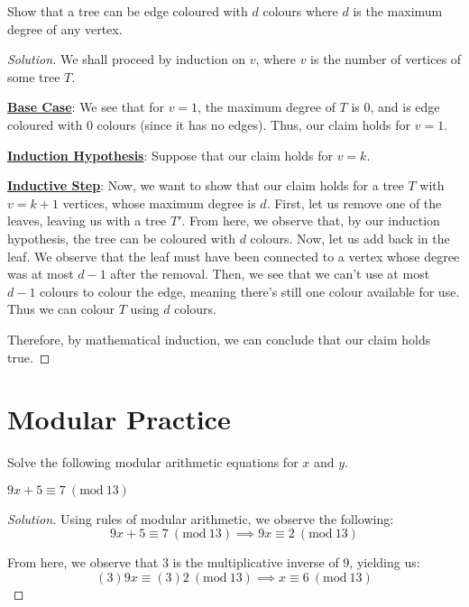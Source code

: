 \documentclass{article}
\newenvironment{solution}{\begin{proof}[Solution]}{\end{proof}}
\newcommand{\Mod}[1]{\ (\mathrm{mod}\ {#1})}
\begin{document}
\begin{hw}
	Show that a tree can be edge coloured with $d$ colours where $d$ is the maximum degree of any vertex.
\end{hw}
\begin{solution}
	We shall proceed by induction on $v$, where $v$ is the number of vertices of some tree $T$.
	
	\textbf{\underline{Base Case}}: We see that for $v=1$, the maximum degree of $T$ is 0, and is edge coloured with 0 colours (since it has no edges). Thus, our claim holds for $v=1$.
	
	\textbf{\underline{Induction Hypothesis}}: Suppose that our claim holds for $v=k$.
	
	\textbf{\underline{Inductive Step}}: Now, we want to show that our claim holds for a tree $T$ with $v=k+1$ vertices, whose maximum degree is $d$. First, let us remove one of the leaves, leaving us with a tree $T'$. From here, we observe that, by our induction hypothesis, the tree can be coloured with $d$ colours. Now, let us add back in the leaf. We observe that the leaf must have been connected to a vertex whose degree was at most $d-1$ after the removal. Then, we see that we can't use at most $d-1$ colours to colour the edge, meaning there's still one colour available for use. Thus we can colour $T$ using $d$ colours.
	
	Therefore, by mathematical induction, we can conclude that our claim holds true.
\end{solution}

\newpage

\section{Modular Practice}
Solve the following modular arithmetic equations for $x$ and $y$.

\begin{hw}
	$9x + 5 \equiv 7 \Mod {13}$
\end{hw}
\begin{solution}
	Using rules of modular arithmetic, we observe the following:
	\begin{equation*}
		9x + 5 \equiv 7 \Mod{13} \implies 9x \equiv 2 \Mod{13}
	\end{equation*}

	From here, we observe that $3$ is the multiplicative inverse of $9$, yielding us:
	\begin{equation*}
		(3)9x \equiv (3)2 \Mod{13} \implies x \equiv 6 \Mod{13}
	\end{equation*}
\end{solution}
\end{document}
